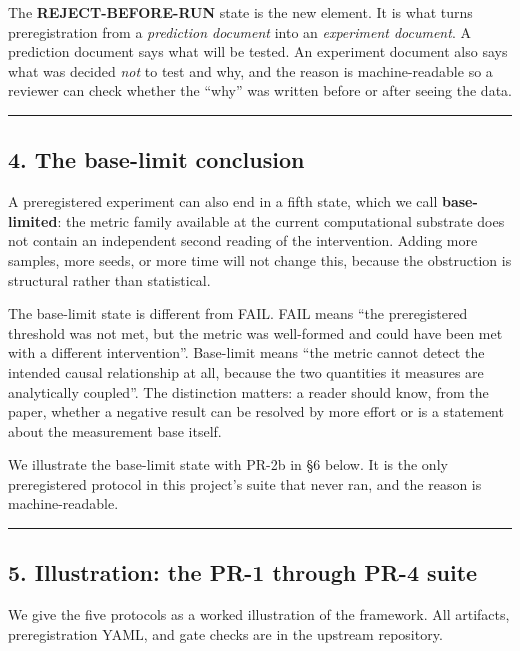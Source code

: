 \documentclass[
]{article}
\begin{document}
The \textbf{REJECT-BEFORE-RUN} state is the new element. It is what
turns preregistration from a \emph{prediction document} into an
\emph{experiment document}. A prediction document says what will be
tested. An experiment document also says what was decided \emph{not} to
test and why, and the reason is machine-readable so a reviewer can check
whether the ``why'' was written before or after seeing the data.

\begin{center}\rule{0.5\linewidth}{0.5pt}\end{center}

\subsection{4. The base-limit
conclusion}\label{the-base-limit-conclusion}

A preregistered experiment can also end in a fifth state, which we call
\textbf{base-limited}: the metric family available at the current
computational substrate does not contain an independent second reading
of the intervention. Adding more samples, more seeds, or more time will
not change this, because the obstruction is structural rather than
statistical.

The base-limit state is different from FAIL. FAIL means ``the
preregistered threshold was not met, but the metric was well-formed and
could have been met with a different intervention''. Base-limit means
``the metric cannot detect the intended causal relationship at all,
because the two quantities it measures are analytically coupled''. The
distinction matters: a reader should know, from the paper, whether a
negative result can be resolved by more effort or is a statement about
the measurement base itself.

We illustrate the base-limit state with PR-2b in §6 below. It is the
only preregistered protocol in this project's suite that never ran, and
the reason is machine-readable.

\begin{center}\rule{0.5\linewidth}{0.5pt}\end{center}

\subsection{5. Illustration: the PR-1 through PR-4
suite}\label{illustration-the-pr-1-through-pr-4-suite}

We give the five protocols as a worked illustration of the framework.
All artifacts, preregistration YAML, and gate checks are in the upstream
repository.
\end{document}
